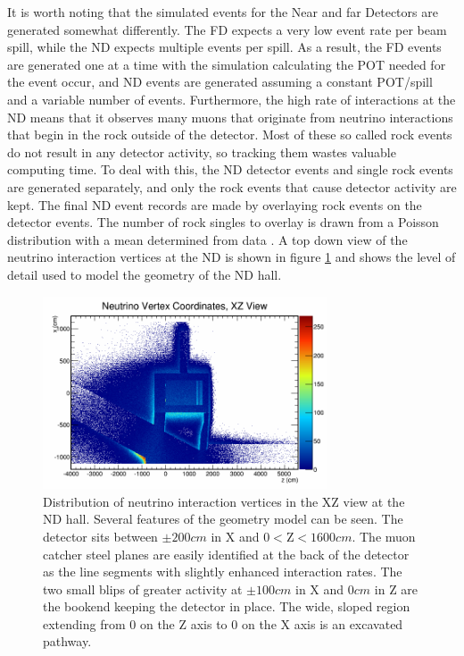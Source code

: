 It is worth noting that the simulated events for the Near and far Detectors are generated somewhat differently. The FD expects a very low event rate per beam spill, while the ND expects multiple events per spill. As a result, the FD events are generated one at a time with the simulation calculating the POT needed for the event occur, and ND events are generated assuming a constant POT/spill and a variable number of events. Furthermore, the high rate of interactions at the ND means that it observes many muons that originate from neutrino interactions that begin in the rock outside of the detector. Most of these so called rock events do not result in any detector activity, so tracking them wastes valuable computing time. To deal with this, the ND detector events and single rock events are generated separately, and only the rock events that cause detector activity are kept. The final ND event records are made by overlaying rock events on the detector events. The number of rock singles to overlay is drawn from a Poisson distribution with a mean determined from data \cite{ref:SimRock}. A top down view of the neutrino interaction vertices at the ND is shown in figure \ref{fig:MCCO_NDVtx} and shows the level of detail used to model the geometry of the ND hall.
\begin{figure}[htb]
  \centering
  \includegraphics[width=0.75\textwidth]{figures/MCCO_NDXZ.png}
  \caption[ND Neutrino Interaction Vertex Distribution]{Distribution of neutrino interaction vertices in the XZ view at the ND hall. Several features of the geometry model can be seen. The detector sits between $\pm200\unit{cm}$ in X and $0 < \mbox{Z} < 1600\unit{cm}$. The muon catcher steel planes are easily identified at the back of the detector as the line segments with slightly enhanced interaction rates. The two small blips of greater activity at $\pm100\unit{cm}$ in X and $0\unit{cm}$ in Z are the bookend keeping the detector in place. The wide, sloped region extending from $0$ on the Z axis to $0$ on the X axis is an excavated pathway.}
  \label{fig:MCCO_NDVtx}
\end{figure}


